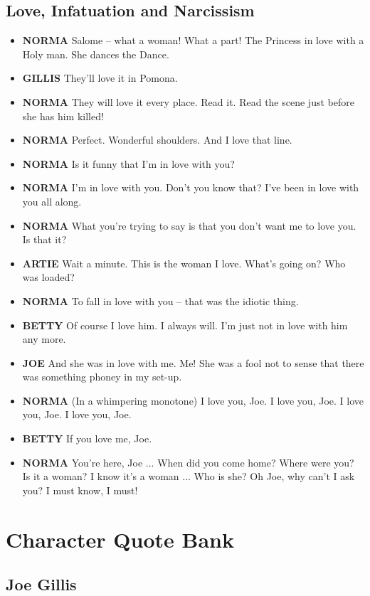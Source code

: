 \documentclass[a4paper]{article}
\begin{document}
\subsection{Love, Infatuation and Narcissism}
\begin{itemize}
\item \textbf{NORMA} Salome -- what a woman! What a part! The Princess in love with a Holy man. She dances the Dance.
\item \textbf{GILLIS} They'll love it in Pomona.
\item \textbf{NORMA} They will love it every place. Read it. Read the scene just before she has him killed!
\item \textbf{NORMA} Perfect. Wonderful shoulders. And I love that line.
\item \textbf{NORMA} Is it funny that I'm in love with you?
\item \textbf{NORMA} I'm in love with you. Don't you know that? I've been in love with you all along.
\item \textbf{NORMA} What you're trying to say is that you don't want me to love you. Is that it?
\item \textbf{ARTIE} Wait a minute. This is the woman I love. What's going on? Who was loaded?
\item \textbf{NORMA} To fall in love with you -- that was the idiotic thing.
\item \textbf{BETTY} Of course I love him. I always will. I'm just not in love with him any more.
\item \textbf{JOE} And she was in love with me. Me! She was a fool not to sense that there was something phoney in my set-up.
\item \textbf{NORMA} (In a whimpering monotone) I love you, Joe. I love you, Joe. I love you, Joe. I love you, Joe.
\item \textbf{BETTY} If you love me, Joe.
\item \textbf{NORMA} You're here, Joe ... When did you come home? Where were you? Is it a woman? I know it's a woman ... Who is she? Oh Joe, why can't I ask you? I must know, I must!
\end{itemize}

\newpage

\section{Character Quote Bank}


\subsection{Joe Gillis}
\end{document}
